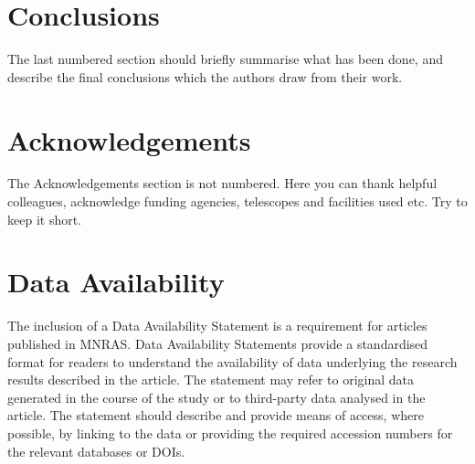 \documentclass[fleqn,usenatbib]{mnras}
\begin{document}
\section{Conclusions}

The last numbered section should briefly summarise what has been done, and describe
the final conclusions which the authors draw from their work.

\section*{Acknowledgements}

The Acknowledgements section is not numbered. Here you can thank helpful
colleagues, acknowledge funding agencies, telescopes and facilities used etc.
Try to keep it short.

\section*{Data Availability}

 
The inclusion of a Data Availability Statement is a requirement for articles published in MNRAS. Data Availability Statements provide a standardised format for readers to understand the availability of data underlying the research results described in the article. The statement may refer to original data generated in the course of the study or to third-party data analysed in the article. The statement should describe and provide means of access, where possible, by linking to the data or providing the required accession numbers for the relevant databases or DOIs.







\end{document}
